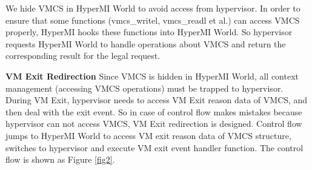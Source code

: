 \documentclass[conference]{IEEEtran}
\begin{document}
We hide VMCS in HyperMI World to avoid access from hypervisor. 
In order to ensure that some functions (vmcs\_writel, vmcs\_readl et al.) can access VMCS properly, HyperMI hooks these functions into HyperMI World. So hypervisor requests HyperMI World to handle operations about VMCS and return the corresponding result for the legal request. 

\textbf{VM Exit Redirection}
Since VMCS is hidden in HyperMI World, all context management (accessing VMCS operations)  must be trapped to hypervisor. During VM Exit, hypervisor needs to access  VM Exit reason data of VMCS, and then deal with the exit event. So in case of control flow makes mistakes because hypervisor can not access VMCS, VM Exit redirection is designed. Control flow jumps to HyperMI World to access VM exit reason data of VMCS structure, switches to hypervisor and execute VM exit event handler function. The control flow is shown as Figure \ref{fig2}.

\end{document}
